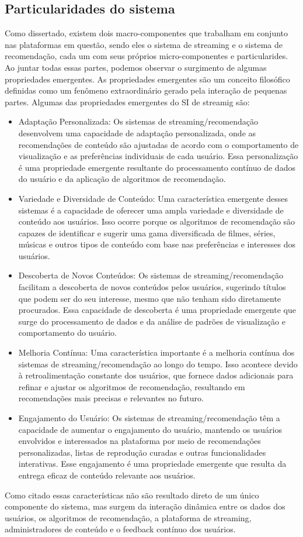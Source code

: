 \documentclass[conference]{IEEEtran}
\begin{document}
\subsection{Particularidades do sistema}\label{AA}
Como dissertado, existem dois macro-componentes que trabalham em conjunto nas plataformas em questão, sendo eles o sistema de streaming  e o sistema de recomendação, cada um com seus próprios micro-componentes e particularides. Ao juntar todas essas partes, podemos observar o surgimento de algumas propriedades emergentes. As propriedades emergentes são um conceito filosófico definidas como um fenômeno extraordinário gerado pela interação de pequenas partes. Algumas das propriedades emergentes do SI de streamig são: 
\begin{itemize}
    \item Adaptação Personalizada: Os sistemas de streaming/recomendação desenvolvem uma capacidade de adaptação personalizada, onde as recomendações de conteúdo são ajustadas de acordo com o comportamento de visualização e as preferências individuais de cada usuário. Essa personalização é uma propriedade emergente resultante do processamento contínuo de dados do usuário e da aplicação de algoritmos de recomendação.
    \item Variedade e Diversidade de Conteúdo:
Uma característica emergente desses sistemas é a capacidade de oferecer uma ampla variedade e diversidade de conteúdo aos usuários. Isso ocorre porque os algoritmos de recomendação são capazes de identificar e sugerir uma gama diversificada de filmes, séries, músicas e outros tipos de conteúdo com base nas preferências e interesses dos usuários.
    \item Descoberta de Novos Conteúdos:
Os sistemas de streaming/recomendação facilitam a descoberta de novos conteúdos pelos usuários, sugerindo títulos que podem ser do seu interesse, mesmo que não tenham sido diretamente procurados. Essa capacidade de descoberta é uma propriedade emergente que surge do processamento de dados e da análise de padrões de visualização e comportamento do usuário.
    \item Melhoria Contínua: Uma característica importante é a melhoria contínua dos sistemas de streaming/recomendação ao longo do tempo. Isso acontece devido à retroalimentação constante dos usuários, que fornece dados adicionais para refinar e ajustar os algoritmos de recomendação, resultando em recomendações mais precisas e relevantes no futuro.
    \item Engajamento do Usuário: Os sistemas de streaming/recomendação têm a capacidade de aumentar o engajamento do usuário, mantendo os usuários envolvidos e interessados na plataforma por meio de recomendações personalizadas, listas de reprodução curadas e outras funcionalidades interativas. Esse engajamento é uma propriedade emergente que resulta da entrega eficaz de conteúdo relevante aos usuários.    
\end{itemize}
Como citado essas características não são resultado direto de um único componente do sistema, mas surgem da interação dinâmica entre os dados dos usuários, os algoritmos de recomendação, a plataforma de streaming, administradores de conteúdo e o feedback contínuo dos usuários.
\end{document}

